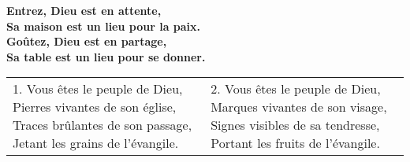 \textbf{Entrez, Dieu est en attente,\\
Sa maison est un lieu pour la paix.\\
Goûtez, Dieu est en partage,\\
Sa table est un lieu pour se donner.}

\begin{tabular}{p{} p{}}
1.
Vous êtes le peuple de Dieu,\newline
Pierres vivantes de son église,\newline
Traces brûlantes de son passage,\newline
Jetant les grains de l'évangile.
&
2.
Vous êtes le peuple de Dieu,\newline
Marques vivantes de son visage,\newline
Signes visibles de sa tendresse,\newline
Portant les fruits de l'évangile.
\end{tabular}

